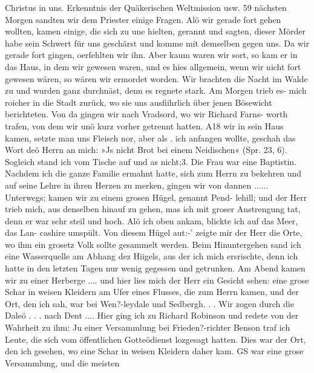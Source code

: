 Christus in uns. Erkenntnis der Quäkerischen Weltmission usw. 59
nächsten Morgen sandten wir dem Priester einige Fragen. Alö
wir gerade fort gehen wollten, kamen einige, die sich zu une
hielten, gerannt und sagten, dieser Mörder habe sein Schwert
für uns geschärst und komme mit demselben gegen uns. Da wir
gerade fort gingen, oerfehlten wir ihn. Aber kaum waren wir
sort, so kam er in das Haus, in dem wir gewesen waren, und
es hies allgemein, wenn wir nicht fort gewesen wären, so wären
wir ermordet worden. Wir brachten die Nacht im Walde zu
und wurden ganz durchnäst, denn es regnete stark. Am Morgen
trieb es- mich roicher in die Stadt zurück, wo sie uns ausfiihrlich
über jenen Bösewicht berichteten.
Von da gingen wir nach Vradsord, wo wir Richard Farns-
worth trafen, von dem wir unö kurz vorher getrennt hatten.
A18 wir in sein Haus kamen, setzte man uns Fleisch nor, aber als
. ich anfangen wollte, geschah das Wort deö Herrn an mich: »Js nicht
Brot bei einem Neidischen« (Spr. 23, 6). Sogleich stand ich
vom Tische auf und as nicht;3. Die Frau war eine Baptistin.
Nachdem ich die ganze Familie ermahnt hatte, sich zum Herrn
zu bekehren und auf seine Lehre in ihren Herzen zu merken,
gingen wir von dannen ......
Unterwegs; kamen wir zu einem grosen Hügel, genannt Pend-
lehill; und der Herr trieb mich, aus denselben hinauf zu gehen,
mas ich mit groser Anstrengung tat, denn er war sehr steil und
hoch. Alö ich oben ankam, blickte ich auf das Meer, das Lan-
cashire umspült. Von diesem Hügel aut:-’ zeigte mir der Herr
die Orte, wo ihm ein grosetz Volk sollte gesammelt werden.
Beim Hinuntergehen sand ich eine Wasserquelle am Abhang
dez Hiigels, aus der ich mich ersrischte, denn ich hatte in den
letzten Tagen nur wenig gegessen und getrunken. Am Abend
kamen wir zu einer Herberge .... und hier lies mich der
Herr ein Gesicht sehen: eine grose Schar in weisen Kleidern
am Ufer eines Flusses, die zum Herrn kamen, und der Ort, den
ich sah, war bei Wen?-leydale und Sedbergh. . .
Wir zogen durch die Daleö . . . nach Dent .... Hier ging
ich zu Richard Robinson und redete von der Wahrheit zu ihm:
Ju einer Versammlung bei Frieden?-richter Benson traf ich Leute,
die sich vom öffentlichen Gotteödienst lozgesagt hatten. Dies
war der Ort, den ich gesehen, wo eine Schar in weisen Kleidern
daher kam. GS war eine grose Versammlung, und die meisten


